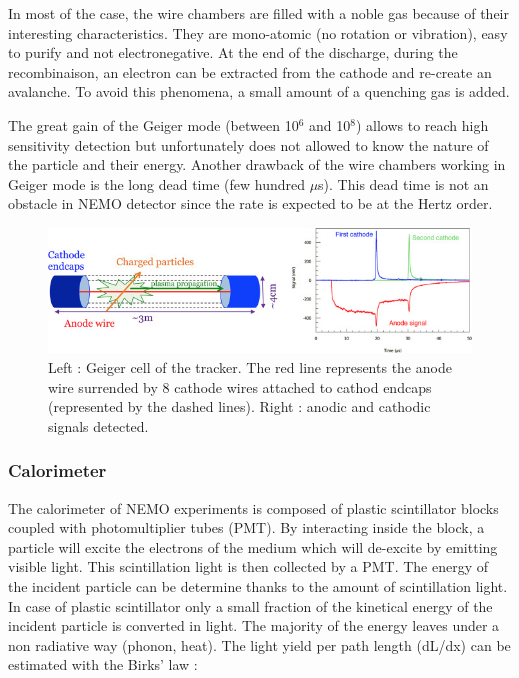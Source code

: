 \documentclass[main.tex]{subfiles}
\begin{document}
\NI In most of the case, the wire chambers are filled with a noble gas because of their interesting characteristics. They are mono-atomic (no rotation or vibration), easy to purify and not electronegative. At the end of the discharge, during the recombinaison, an electron can be extracted from the cathode and re-create an avalanche. To avoid this phenomena, a small amount of a quenching gas is added.


\bigskip


\NI The great gain of the Geiger mode (between 10$^\text{6}$ and 10$^\text{8}$) allows to reach high sensitivity detection but unfortunately does not allowed to know the nature of the particle and their energy. Another drawback of the wire chambers working in Geiger mode is the long dead time (few hundred $\mu$s). This dead time is not an obstacle in NEMO detector since the rate is expected to be at the Hertz order.    




\begin{figure}[h!]
\begin{center}
\includegraphics[scale=0.80]{pictures/Chap3/trackerSchema.jpg}
\caption{Left : Geiger cell of the tracker. The red line represents the anode wire surrended by 8 cathode wires attached to cathod endcaps (represented by the dashed lines). Right : anodic and cathodic signals detected.}
\label{trackerSignal}
\end{center}
\end{figure}



\subsubsection{Calorimeter}


\NI The calorimeter of NEMO experiments is composed of plastic scintillator blocks coupled with photomultiplier tubes (PMT). By interacting inside the block, a particle will excite the electrons of the medium which will de-excite by emitting visible light. This scintillation light is then collected by a PMT. The energy of the incident particle can be determine thanks to the amount of scintillation light. In case of plastic scintillator only a small fraction of the kinetical energy of the incident particle is converted in light. The majority of the energy leaves under a non radiative way (phonon, heat). The light yield per path length (dL/dx) can be estimated with the Birks' law : 
\end{document}
